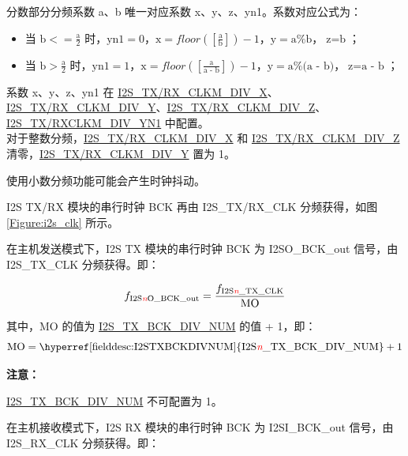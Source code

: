 \documentclass[main\_\_CN.tex]{subfiles}
\begin{document}
分数部分分频系数 a、b 唯一对应系数 x、y、z、yn1。系数对应公式为：
\begin{itemize}
    \item 当 $\textrm{b} <= \frac{\textrm{a}}{2}$ 时，$\textrm{yn1} = 0$，$\textrm{x} = floor([\frac{\textrm{a}}{\textrm{b}}]) - 1$，$\textrm{y} = \textrm{a}\%\textrm{b}$，$\textrm{z} = \textrm{b}$；
    \item 当 $\textrm{b} > \frac{\textrm{a}}{2}$ 时，$\textrm{yn1}=1$，$\textrm{x} = floor([\frac{\textrm{a}}{\textrm{a - b}}]) - 1$，$\textrm{y} = \textrm{a}\%\textrm{(a - b)}$，$\textrm{z}=\textrm{a - b}$；
\end{itemize}

系数 x、y、z、yn1 在 \hyperref[fielddesc:I2STXCLKMDIVX]{I2S\_TX/RX\_CLKM\_DIV\_X}、\hyperref[fielddesc:I2STXCLKMDIVY]{I2S\_TX/RX\_CLKM\_DIV\_Y}、\hyperref[fielddesc:I2STXCLKMDIVZ]{I2S\_TX/RX\_CLKM\_DIV\_Z}、\hyperref[fielddesc:I2STXCLKMDIVYN1]{I2S\_TX/RXCLKM\_DIV\_YN1} 中配置。 \\
对于整数分频，\hyperref[fielddesc:I2STXCLKMDIVX]{I2S\_TX/RX\_CLKM\_DIV\_X} 和 \hyperref[fielddesc:I2STXCLKMDIVZ]{I2S\_TX/RX\_CLKM\_DIV\_Z} 清零，\hyperref[fielddesc:I2STXCLKMDIVY]{I2S\_TX/RX\_CLKM\_DIV\_Y} 置为 1。

\begin{tiplisting}
使用小数分频功能可能会产生时钟抖动。
\end{tiplisting}

I2S TX/RX 模块的串行时钟 BCK 再由 I2S\_TX/RX\_CLK 分频获得，如图 \ref{Figure:i2s_clk} 所示。

在主机发送模式下，I2S TX 模块的串行时钟 BCK 为 I2SO\_BCK\_out 信号，由 I2S\_TX\_CLK 分频获得。即：

$$f_{\textrm{I2S\textcolor{red}{\it{n}}O\_BCK\_out}} = \frac{f_{\textrm{I2S\textcolor{red}{\it{n}}\_TX\_CLK}}}{\textrm{MO}}$$


其中，MO 的值为 \hyperref[fielddesc:I2STXBCKDIVNUM]{I2S\_TX\_BCK\_DIV\_NUM} 的值 + 1，即：
$$ \textrm{MO} = \textrm{\hyperref[fielddesc:I2STXBCKDIVNUM]{I2S\regindex{n}\_TX\_BCK\_DIV\_NUM}} + 1 $$

{\bfseries 注意：}

\hyperref[fielddesc:I2STXBCKDIVNUM]{I2S\_TX\_BCK\_DIV\_NUM} 不可配置为 1。

在主机接收模式下，I2S RX 模块的串行时钟 BCK 为 I2SI\_BCK\_out 信号，由 I2S\_RX\_CLK 分频获得。即：
\end{document}
